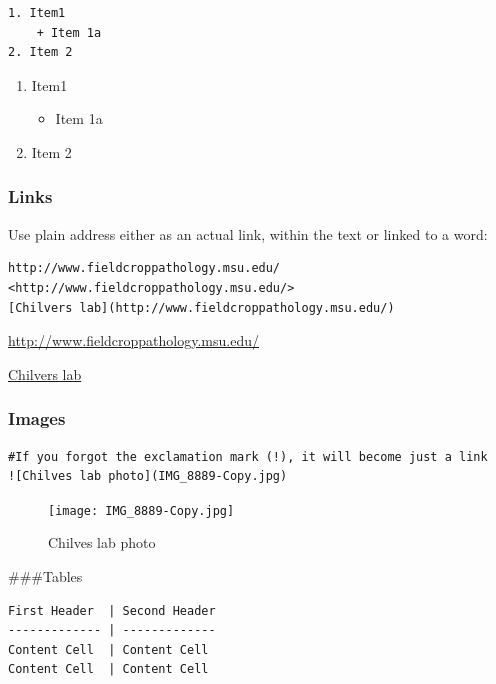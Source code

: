 \documentclass[
]{article}
\providecommand{\tightlist}{%
  \setlength{\itemsep}{0pt}\setlength{\parskip}{0pt}}
\begin{document}
\begin{verbatim}
1. Item1
    + Item 1a
2. Item 2
\end{verbatim}

\begin{enumerate}
\def\labelenumi{\arabic{enumi}.}
\tightlist
\item
  Item1

  \begin{itemize}
  \tightlist
  \item
    Item 1a
  \end{itemize}
\item
  Item 2
\end{enumerate}

\hypertarget{links}{%
\subsubsection{Links}\label{links}}

Use plain address either as an actual link, within the text or linked to
a word:

\begin{verbatim}
http://www.fieldcroppathology.msu.edu/
<http://www.fieldcroppathology.msu.edu/>
[Chilvers lab](http://www.fieldcroppathology.msu.edu/)
\end{verbatim}

\url{http://www.fieldcroppathology.msu.edu/}

\href{http://www.fieldcroppathology.msu.edu/}{Chilvers lab}

\hypertarget{images}{%
\subsubsection{Images}\label{images}}

\begin{verbatim}
#If you forgot the exclamation mark (!), it will become just a link
![Chilves lab photo](IMG_8889-Copy.jpg)
\end{verbatim}

\begin{figure}
\centering
\texttt{[image: IMG\_8889-Copy.jpg]}
\caption{Chilves lab photo}
\end{figure}

\#\#\#Tables

\begin{verbatim}
First Header  | Second Header
------------- | -------------
Content Cell  | Content Cell
Content Cell  | Content Cell
\end{verbatim}
\end{document}
